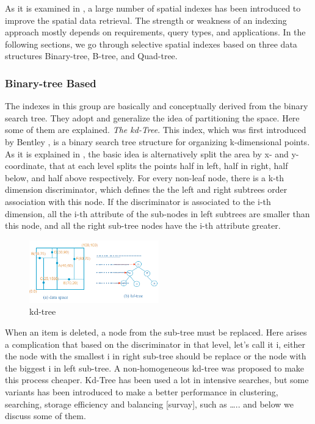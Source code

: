 \documentclass[a4paper,12pt]{article}
\begin{document}
As it is examined in \cite{survey}, a large number of spatial indexes has been introduced to improve the spatial data retrieval.
The strength or weakness of an indexing approach mostly depends on requirements, query types, and applications. In the following sections, we go through selective spatial indexes based on three data structures Binary-tree, B-tree, and Quad-tree.

\subsubsection{Binary-tree Based}
The indexes in this group are basically and conceptually derived from the binary search tree. They adopt and generalize the idea of partitioning the space. Here some of them are explained.
\emph{The kd-Tree}.
This index, which was first introduced by Bentley \cite{bently1975}, is a binary search tree structure for organizing k-dimensional points. As it is explained in \cite{bently1975}, the basic idea is alternatively split the area by x- and y-coordinate, that at each level splits the points half in left, half in right, half below, and half above respectively. For every non-leaf node, there is a k-th dimension discriminator, which defines the the left and right subtrees order association with this node. If the discriminator is associated to the i-th dimension, all the i-th attribute of the sub-nodes in left subtrees are smaller than this node, and all the right sub-tree nodes have the i-th attribute greater.

\begin{figure}
\centering
\includegraphics[width=0.5\textwidth]{kdtree}
\caption{kd-tree}
\label{figkdtree}
\end{figure}


When an item is deleted, a node from the sub-tree must be replaced. Here arises a complication that based on the discriminator in that level, let's call it i, either the node with the smallest i in right sub-tree should be replace or  the node with the biggest i in left sub-tree. A non-homogeneous kd-tree was proposed to make this process cheaper. 
Kd-Tree has been used a lot in intensive searches, but some variants has been introduced to make a better performance in clustering, searching, storage efficiency and balancing [survay], such as …..
and below we discuss some of them.
\end{document}
